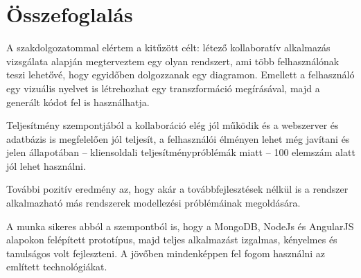 \chapter{Összefoglalás}

A szakdolgozatommal elértem a kitűzött célt: létező kollaboratív alkalmazás vizsgálata alapján megterveztem egy olyan rendszert, ami több felhasználónak teszi lehetővé, hogy egyidőben dolgozzanak egy diagramon. Emellett a felhasználó egy vizuális nyelvet is létrehozhat egy transzformáció megírásával, majd a generált kódot fel is használhatja. 

Teljesítmény szempontjából a kollaboráció elég jól működik és a webszerver és adatbázis is megfelelően jól teljesít, a felhasználói élményen lehet még javítani és jelen állapotában -- kliensoldali teljesítménypróblémák miatt -- 100 elemszám alatt jól lehet használni.

További pozitív eredmény az, hogy akár a továbbfejlesztések nélkül is a rendszer alkalmazható más rendszerek modellezési próblémáinak megoldására. 

A munka sikeres abból a szempontból is, hogy a MongoDB, NodeJs és AngularJS alapokon felépített prototípus, majd teljes alkalmazást izgalmas, kényelmes és tanulságos volt fejleszteni. A jövőben mindenképpen fel fogom használni az említett technológiákat.






